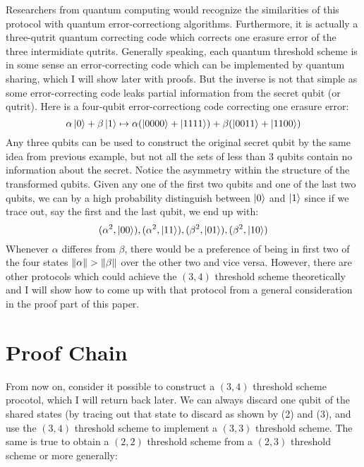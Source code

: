 \documentclass[12pt]{article}
\begin{document}
Researchers from quantum computing would recognize the similarities of this protocol with quantum error-correctiong algorithms. Furthermore, it is actually a three-qutrit quantum correcting code which corrects one erasure error of the three intermidiate qutrits. Generally speaking, each quantum threshold scheme is in some sense an error-correcting code which can be implemented by quantum sharing, which I will show later with proofs. But the inverse is not that simple as some error-correcting code leaks partial information from the secret qubit (or qutrit). Here is a four-qubit error-correctiong code correcting one erasure error:
\begin{equation*}
	\alpha \ket{0} + \beta \ket{1} \mapsto \alpha ( \ket{0000} + \ket{1111}) + \beta ( \ket{0011} + \ket{1100})
\end{equation*}
Any three qubits can be used to construct the original secret qubit by the same idea from previous example, but not all the sets of less than $3$ qubits contain no information about the secret. Notice the asymmetry within the structure of the transformed qubits. Given any one of the first two qubits and one of the last two qubits, we can by a high probability distinguish between $\ket{0}$ and $\ket{1}$ since if we trace out, say the first and the last qubit, we end up with:
\begin{equation}
	( \alpha ^2, \ket{00}), ( \alpha ^2, \ket{11}), ( \beta ^2, \ket{01}), ( \beta ^2, \ket{10})
\end{equation}
Whenever $ \alpha $ differes from $ \beta $, there would be a preference of being in first two of the four states $ \norm{\alpha} > \norm{\beta} $ over the other two and vice versa.
However, there are other protocols which could achieve the $(3,4)$ threshold scheme theoretically and I will show how to come up with that protocol from a general consideration in the proof part of this paper.\\
\section{Proof Chain}
From now on, consider it possible to construct a $(3, 4)$ threshold scheme procotol, which I will return back later. We can always discard one qubit of the shared states (by tracing out that state to discard as shown by (2) and (3), and use the $(3,4)$ threshold scheme to implement a $(3, 3)$ threshold scheme. The same is true to obtain a $(2,2)$ threshold scheme from a $(2, 3)$ threshold scheme or more generally:
\end{document}
